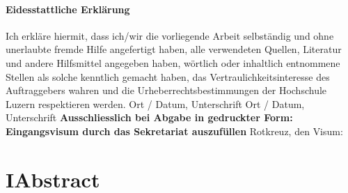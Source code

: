 \documentclass[a4paper, table]{article}
\begin{document}
\paragraph{\textbf{Eidesstattliche Erkl\"arung}}
Ich erkl\"are hiermit, dass ich/wir die vorliegende Arbeit selbst\"andig und ohne unerlaubte fremde Hilfe angefertigt haben, alle verwendeten Quellen, Literatur und andere Hilfsmittel angegeben haben, w\"ortlich oder inhaltlich entnommene Stellen als solche kenntlich gemacht haben, das Vertraulichkeitsinteresse des Auftraggebers wahren und die Urheberrechtsbestimmungen der Hochschule Luzern respektieren werden. \newline \newline
Ort / Datum, Unterschrift	\underline{\hspace*{8cm}} \newline \newline
Ort / Datum, Unterschrift	\underline{\hspace*{8cm}} \newline \newline \newline
\textbf{Ausschliesslich bei Abgabe in gedruckter Form: \\
Eingangsvisum durch das Sekretariat auszuf\"ullen}\newline \newline
Rotkreuz, den	\underline{\hspace*{4cm}}	\hspace*{1cm} Visum:	\underline{\hspace*{4cm}}

\normalfont
\newpage
\section*{I{\hspace*{1cm}}Abstract}

\newpage

\tableofcontents

\newpage
\end{document}
